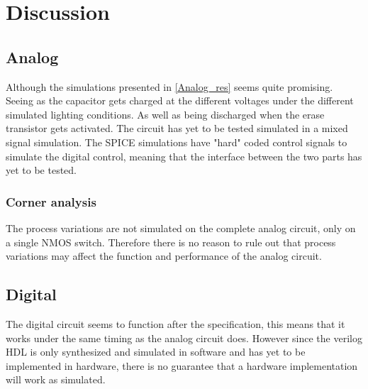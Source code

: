 \section{Discussion}
\subsection{Analog}
Although the simulations presented in \cref{Analog_res} seems quite promising. 
Seeing as the capacitor gets charged at the different voltages under the different simulated lighting conditions. 
As well as being discharged when the erase transistor gets activated. 
The circuit has yet to be tested simulated in a mixed signal simulation. 
The SPICE simulations have "hard" coded control signals to simulate the digital control, meaning that the interface between the two parts has yet to be tested.

\subsubsection{Corner analysis}
The process variations are not simulated on the complete analog circuit, only on a single NMOS switch. 
Therefore there is no reason to rule out that process variations may affect the function and performance of the analog circuit.

\subsection{Digital}
The digital circuit seems to function after the specification, this means that it works under the same timing as the analog circuit does. 
However since the verilog HDL is only synthesized and simulated in software and has yet to be implemented in hardware, there is no guarantee that a hardware implementation will work as simulated.